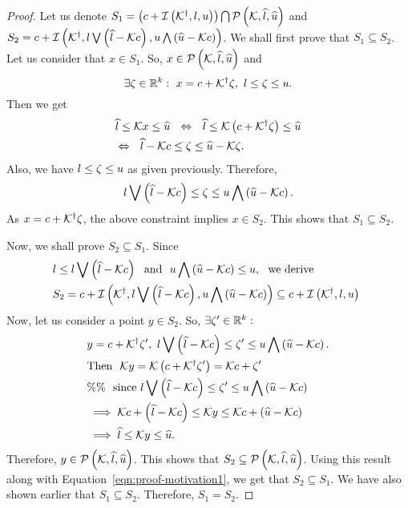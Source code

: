 \begin{proof}
Let us denote
$S_1=\left(c+\mathit{\operatorname{\mathcal{I}}}\left({\mathcal{K}}^\dagger,l,u\right)\right)\bigcap\mathcal{P}\left(\mathcal{K},\widehat{l},\widehat{u}\right)$
and\\
$S_2=c+\mathit{\operatorname{\mathcal{I}}}\left({\mathcal{K}}^\dagger,l\bigvee \left(\widehat{l}-\mathcal{K}c\right),u\bigwedge \left(\widehat{u}-\mathcal{K}c\right)\right)$.
We shall first prove that $S_1\subseteq S_2$.  Let us consider that
$x\in S_1$.  So, $x\in\mathcal{P}\left(\mathcal{K},\widehat{l},\widehat{u}\right)$ and
%
\[
\exists
\zeta\in\mathbb{R}^k:~x=c+{\mathcal{K}}^\dagger\zeta,~l\leq\zeta\leq u.
\]
%
Then we get
%
\begin{align*}
& \widehat{l}\leq\mathcal{K} x\leq \widehat{u}~~
 \Leftrightarrow~~ \widehat{l}\leq \mathcal{K}\left(c+{\mathcal{K}}^\dagger\zeta\right)\leq \widehat{u}\\
& \Leftrightarrow~~ \widehat{l}-\mathcal{K}c\leq\zeta\leq\widehat{u}-\mathcal{K}\zeta.
\end{align*}
%
Also, we have $l\leq \zeta\leq u$ as given previously.
Therefore,
\[l\bigvee \left(\widehat{l}-\mathcal{K}c\right)\leq\zeta\leq u\bigwedge \left(\widehat{u}-\mathcal{K}c\right).\]
As $x=c+{\mathcal{K}}^\dagger\zeta$, the above constraint implies $x\in S_2$.  This shows that $S_1\subseteq S_2$.

Now, we shall prove $S_2\subseteq S_1$.  Since
\begin{align}
&l\leq l\bigvee \left(\widehat{l}-\mathcal{K}c\right)~~\text{and}~~u\bigwedge \left(\widehat{u}-\mathcal{K}c\right)\leq
u,~~\text{we derive}\nonumber\\
&
S_2=c+\mathit{\operatorname{\mathcal{I}}}\left({\mathcal{K}}^\dagger,l\bigvee \left(\widehat{l}-\mathcal{K}c\right),u\bigwedge \left(\widehat{u}-\mathcal{K}c\right)\right)
\subseteq c+\mathit{\operatorname{\mathcal{I}}}\left({\mathcal{K}}^\dagger,l,u\right)~\label{eqn:proof-motivation1}
\end{align}
%
Now, let us consider a point $y\in S_2$.  So, $\exists
\zeta^\prime\in\mathbb{R}^k:$
%
\begin{align*}
& y=c+{\mathcal{K}}^\dagger\zeta^\prime,~l\bigvee \left(\widehat{l}-\mathcal{K}c\right)\leq\zeta^\prime
\leq u\bigwedge \left(\widehat{u}-\mathcal{K}c\right).\\
& \text{Then}~~
\mathcal{K} y=\mathcal{K}\left(c+{\mathcal{K}}^\dagger\zeta^\prime\right)=\mathcal{K}c+\zeta^\prime\\
& \%\%~~\text{since}~l\bigvee \left(\widehat{l}-\mathcal{K}c\right)\leq\zeta^\prime\leq
u\bigwedge \left(\widehat{u}-\mathcal{K}c\right)\\
& \implies \mathcal{K}c+\left(\widehat{l}-\mathcal{K}c\right)\leq\mathcal{K} y\leq
\mathcal{K}c+\left(\widehat{u}-\mathcal{K}c\right)\\
& \implies \widehat{l}\leq\mathcal{K} y\leq\widehat{u}.
\end{align*}
%
Therefore, $y\in\mathcal{P}\left(\mathcal{K},\widehat{l},\widehat{u}\right)$.  This shows that
$S_2\subseteq \mathcal{P}\left(\mathcal{K},\widehat{l},\widehat{u}\right)$.  Using this result along with
Equation~\ref{eqn:proof-motivation1}, we get that $S_2\subseteq S_1$.
We have also shown earlier that ${S_1\subseteq S_2}$.  Therefore, $S_1=S_2$.
\end{proof}
%


